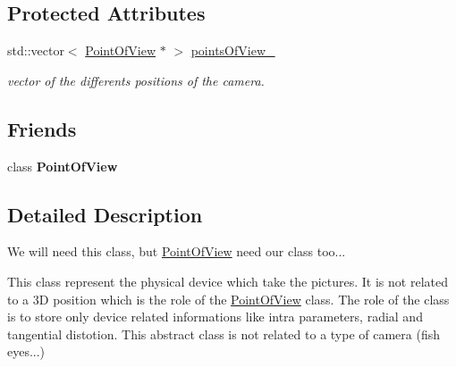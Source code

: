 \subsection*{Protected Attributes}
\begin{DoxyCompactItemize}
\item 
\hypertarget{class_opencv_sf_m_1_1_camera_a51667a509ef8baa90262e5552017b131}{
std::vector$<$ \hyperlink{class_opencv_sf_m_1_1_point_of_view}{PointOfView} $\ast$ $>$ \hyperlink{class_opencv_sf_m_1_1_camera_a51667a509ef8baa90262e5552017b131}{pointsOfView\_\-}}
\label{class_opencv_sf_m_1_1_camera_a51667a509ef8baa90262e5552017b131}

\begin{DoxyCompactList}\small\item\em vector of the differents positions of the camera. \end{DoxyCompactList}\end{DoxyCompactItemize}
\subsection*{Friends}
\begin{DoxyCompactItemize}
\item 
\hypertarget{class_opencv_sf_m_1_1_camera_afe272cb7738811e04232a2a03c9c0224}{
class {\bfseries PointOfView}}
\label{class_opencv_sf_m_1_1_camera_afe272cb7738811e04232a2a03c9c0224}

\end{DoxyCompactItemize}


\subsection{Detailed Description}
We will need this class, but \hyperlink{class_opencv_sf_m_1_1_point_of_view}{PointOfView} need our class too... 

This class represent the physical device which take the pictures. It is not related to a 3D position which is the role of the \hyperlink{class_opencv_sf_m_1_1_point_of_view}{PointOfView} class. The role of the class is to store only device related informations like intra parameters, radial and tangential distotion. This abstract class is not related to a type of camera (fish eyes...)

